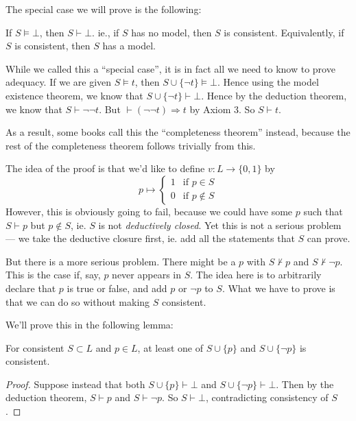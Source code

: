 \documentclass[a4paper]{article}
\begin{document}
The special case we will prove is the following:
\begin{thm}
  If $S\models \bot$, then $S\vdash \bot$. ie., if $S$ has no model, then $S$ is consistent. Equivalently, if $S$ is consistent, then $S$ has a model.

\end{thm}

While we called this a ``special case'', it is in fact all we need to know to prove adequacy. If we are given $S\models t$, then $S\cup \{\neg t\} \models \bot$. Hence using the model existence theorem, we know that $S\cup \{\neg t\} \vdash \bot$. Hence by the deduction theorem, we know that $S\vdash \neg \neg t$. But $\vdash (\neg\neg t)\Rightarrow t$ by Axiom 3. So $S\vdash t$.

As a result, some books call this the ``completeness theorem'' instead, because the rest of the completeness theorem follows trivially from this.

The idea of the proof is that we'd like to define $v: L \to \{0, 1\}$ by
\[
  p\mapsto
  \begin{cases}
    1 & \text{if } p\in S\\
    0 & \text{if } p\not\in S
  \end{cases}
\]
However, this is obviously going to fail, because we could have some $p$ such that $S\vdash p$ but $p\not\in S$, ie. $S$ is not \emph{deductively closed}. Yet this is not a serious problem --- we take the deductive closure first, ie. add all the statements that $S$ can prove.

But there is a more serious problem. There might be a $p$ with $S\not\vdash p$ and $S\not\vdash \neg p$. This is the case if, say, $p$ never appears in $S$. The idea here is to arbitrarily declare that $p$ is true or false, and add $p$ or $\neg p$ to $S$. What we have to prove is that we can do so without making $S$ consistent.

We'll prove this in the following lemma:
\begin{lemma}
  For consistent $S\subset L$ and $p\in L$, at least one of $S\cup \{p\}$ and $S\cup \{\neg p\}$ is consistent.
\end{lemma}

\begin{proof}
  Suppose instead that both $S\cup \{p\} \vdash \bot$ and $S\cup \{\neg p\}\vdash \bot$. Then by the deduction theorem, $S\vdash p$ and $S\vdash \neg p$. So $S\vdash \bot$, contradicting consistency of $S$.
\end{proof}
\end{document}
